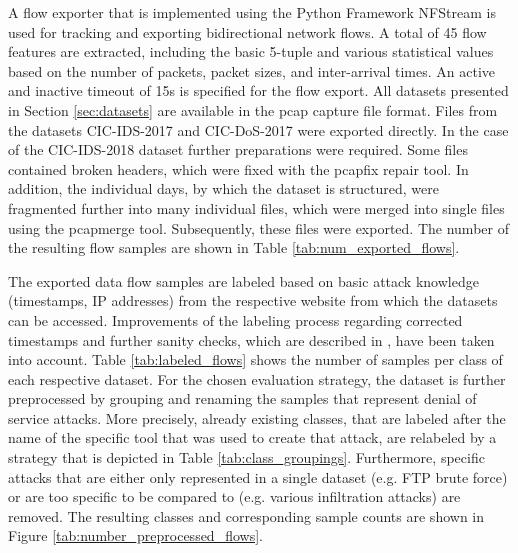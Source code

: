 \documentclass[../../main.tex]{subfiles}
\begin{document}
A flow exporter that is implemented using the Python Framework NFStream is used for tracking and exporting bidirectional network flows. A total of 45 flow features are extracted, including the basic 5-tuple and various statistical values based on the number of packets, packet sizes, and inter-arrival times. An active and inactive timeout of 15s is specified for the flow export. All datasets presented in Section \ref{sec:datasets} are available in the pcap capture file format. Files from the datasets CIC-IDS-2017 and CIC-DoS-2017 were exported directly. In the case of the CIC-IDS-2018 dataset further preparations were required. Some files contained broken headers, which were fixed with the pcapfix repair tool. In addition, the individual days, by which the dataset is structured, were fragmented further into many individual files, which were merged into single files using the pcapmerge tool. Subsequently, these files were exported. The number of the resulting flow samples are shown in Table \ref{tab:num_exported_flows}.


The exported data flow samples are labeled based on basic attack knowledge (timestamps, IP addresses) from the respective website from which the datasets can be accessed. Improvements of the labeling process regarding corrected timestamps and further sanity checks, which are described in \cite{engelen2021}, have been taken into account. Table \ref{tab:labeled_flows} shows the number of samples per class of each respective dataset. For the chosen evaluation strategy, the dataset is further preprocessed by grouping and renaming the samples that represent denial of service attacks. More precisely, already existing classes, that are labeled after the name of the specific tool that was used to create that attack, are relabeled by a strategy that is depicted in Table \ref{tab:class_groupings}. Furthermore, specific attacks that are either only represented in a single dataset (e.g. FTP brute force) or are too specific to be compared to (e.g. various infiltration attacks) are removed. The resulting classes and corresponding sample counts are shown in Figure \ref{tab:number_preprocessed_flows}. 

 

 
\end{document}
